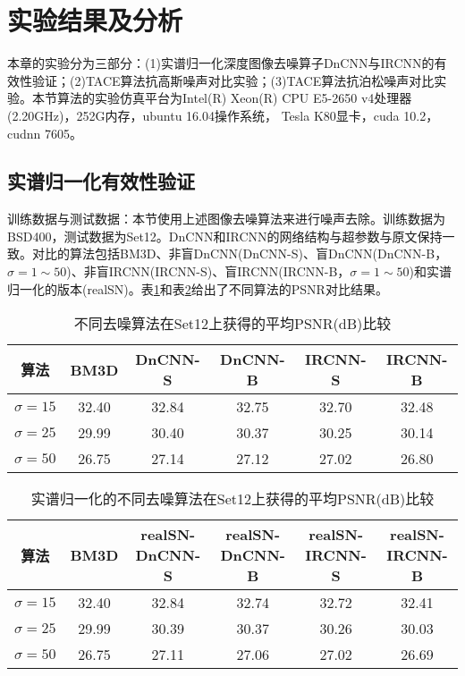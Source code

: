 \section{实验结果及分析}
本章的实验分为三部分：(1)实谱归一化深度图像去噪算子DnCNN与IRCNN的有效性验证；(2)TACE算法抗高斯噪声对比实验；(3)TACE算法抗泊松噪声对比实验。本节算法的实验仿真平台为Intel(R) Xeon(R) CPU E5-2650 v4处理器(2.20GHz)，252G内存，ubuntu 16.04操作系统， Tesla K80显卡，cuda 10.2，cudnn 7605。

\subsection{实谱归一化有效性验证}
训练数据与测试数据：本节使用上述图像去噪算法来进行噪声去除。训练数据为BSD400，测试数据为Set12。DnCNN和IRCNN的网络结构与超参数与原文保持一致\supercite{Kai}。对比的算法包括BM3D、非盲DnCNN(DnCNN-S)、盲DnCNN(DnCNN-B，$\sigma=1\sim{50}$)、非盲IRCNN(IRCNN-S)、盲IRCNN(IRCNN-B，$\sigma=1\sim{50}$)和实谱归一化的版本(realSN)。表\ref{table:3-1}和表\ref{table:3-2}给出了不同算法的PSNR对比结果。
\begin{table}[!htbp]
	\def\arraystretch{1.4}\centering{}
	\caption{不同去噪算法在Set12上获得的平均PSNR(dB)比较}
	\label{table:3-1}
	\begin{tabular*}{\linewidth}{@{}@{\extracolsep{\fill}}cccccc@{}}
		\toprule
		算法				 & BM3D & DnCNN-S & DnCNN-B & IRCNN-S & IRCNN-B  \\
		\midrule
		$\sigma=15$        & 32.40   &\color{red}32.84  & 32.75 & 32.70 & 32.48 \\
		$\sigma=25$        & 29.99   &\color{red}30.40  & 30.37 & 30.25 & 30.14 \\
		$\sigma=50$        & 26.75   &\color{red}27.14  & 27.12 & 27.02 & 26.80 \\
		\bottomrule
	\end{tabular*}
\end{table}
\begin{table}[!htbp]
	\def\arraystretch{1.4}\centering{}
	\caption{实谱归一化的不同去噪算法在Set12上获得的平均PSNR(dB)比较} 
	\label{table:3-2}
	\begin{tabular*}{\linewidth}{@{}@{\extracolsep{\fill}}cccccc@{}}
		\toprule
		算法    & BM3D & realSN-DnCNN-S & realSN-DnCNN-B & realSN-IRCNN-S & realSN-IRCNN-B  \\
		\midrule
		$\sigma=15$        & 32.40   &\color{red}32.84  & 32.74 & 32.72 & 32.41 \\
		$\sigma=25$        & 29.99   &\color{red}30.39  & 30.37 & 30.26 & 30.03 \\
		$\sigma=50$        & 26.75   &\color{red}27.11  & 27.06 & 27.02 & 26.69 \\
		\bottomrule
	\end{tabular*}
\end{table}

